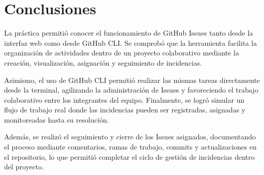 \section{Conclusiones}

La práctica permitió conocer el funcionamiento de GitHub Issues tanto desde la interfaz web como desde GitHub CLI. Se comprobó que la herramienta facilita la organización de actividades dentro de un proyecto colaborativo mediante la creación, visualización, asignación y seguimiento de incidencias.

Asimismo, el uso de GitHub CLI permitió realizar las mismas tareas directamente desde la terminal, agilizando la administración de Issues y favoreciendo el trabajo colaborativo entre los integrantes del equipo. Finalmente, se logró simular un flujo de trabajo real donde las incidencias pueden ser registradas, asignadas y monitoreadas hasta su resolución.

Además, se realizó el seguimiento y cierre de los Issues asignados, documentando el proceso mediante comentarios, ramas de trabajo, commits y actualizaciones en el repositorio, lo que permitió completar el ciclo de gestión de incidencias dentro del proyecto.